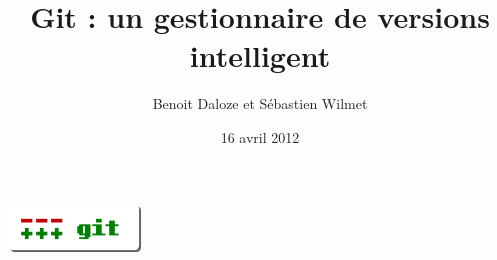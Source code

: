 \documentclass{beamer}
\title[Git]{Git : un gestionnaire de versions intelligent}
\author{Benoit Daloze et Sébastien Wilmet}
\date{16 avril 2012}
\begin{document}
\begin{frame}
\titlepage
\begin{center}
  \includegraphics[width=100pt]{git-logo}
\end{center}
\end{frame}


\begin{frame}
  \tableofcontents
\end{frame}





\end{document}
